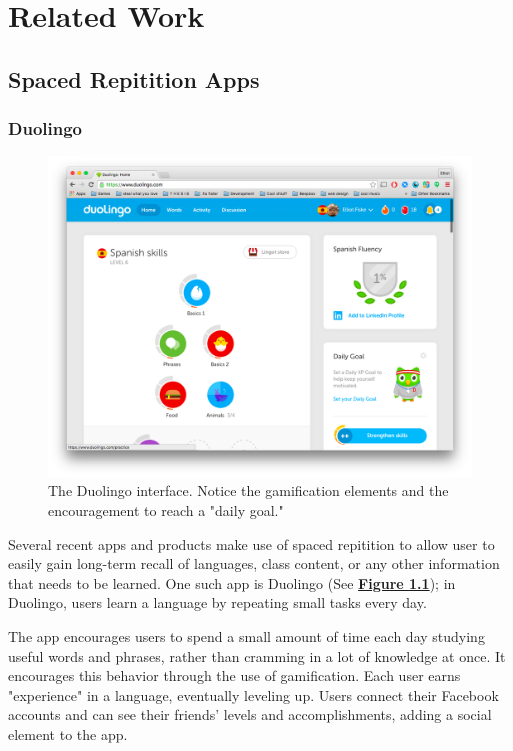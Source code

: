 \chapter{Related Work}


\section{Spaced Repitition Apps}
\subsection{Duolingo}

\begin{figure}
	\centerline{\includegraphics[width=1.2\linewidth]{duolingo}}
	\caption[Duolingo]{The Duolingo interface. Notice the gamification elements and the encouragement to reach a "daily goal."}
	\label{fig:duolingo}
\end{figure}

\par Several recent apps and products make use of spaced repitition to allow user to easily gain long-term recall of languages, class content, or any other information that needs to be learned. One such app is Duolingo (See \textbf{\hyperref[fig:duolingo]{Figure \ref*{fig:duolingo}}}); in Duolingo, users learn a language by repeating small tasks every day. 

\par The app encourages users to spend a small amount of time each day studying useful words and phrases, rather than cramming in a lot of knowledge at once. It encourages this behavior through the use of gamification. Each user earns "experience" in a language, eventually leveling up. Users connect their Facebook accounts and can see their friends' levels and accomplishments, adding a social element to the app.

